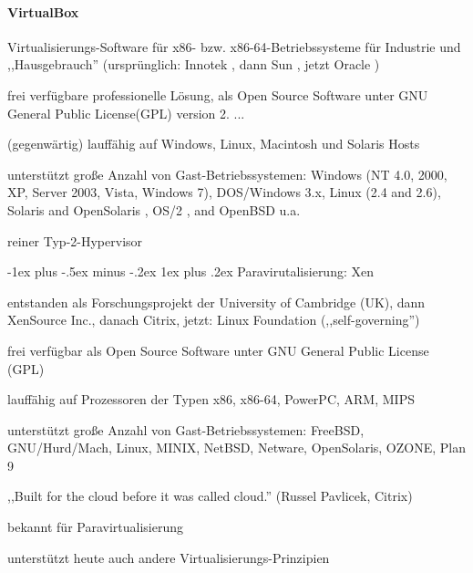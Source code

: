 \documentclass[a4paper]{article}
\makeatletter
\renewcommand{\subsubsection}{\@startsection{subsubsection}{3}{0mm}%
 {-1ex plus -.5ex minus -.2ex}%
 {1ex plus .2ex}%
 {\normalfont\small\bfseries}}
\makeatother
\begin{document}
\begin{multicols}{3}
    \paragraph{VirtualBox}

    \begin{itemize*}
        \item
        Virtualisierungs-Software für x86- bzw. x86-64-Betriebssysteme für
        Industrie und ,,Hausgebrauch'' (ursprünglich: Innotek , dann Sun ,
        jetzt Oracle )
        \item
        frei verfügbare professionelle Lösung, als Open Source Software unter
        GNU General Public License(GPL) version 2. ...
        \item
        (gegenwärtig) lauffähig auf Windows, Linux, Macintosh und Solaris
        Hosts
        \item
        unterstützt große Anzahl von Gast-Betriebssystemen: Windows (NT 4.0,
        2000, XP, Server 2003, Vista, Windows 7), DOS/Windows 3.x, Linux (2.4
        and 2.6), Solaris and OpenSolaris , OS/2 , and OpenBSD u.a.
        \item
        reiner Typ-2-Hypervisor
    \end{itemize*}


    \subsubsection{Paravirutalisierung: Xen}

    \begin{itemize*}
        \item
        entstanden als Forschungsprojekt der University of Cambridge (UK),
        dann XenSource Inc., danach Citrix, jetzt: Linux Foundation
        (,,self-governing'')
        \item
        frei verfügbar als Open Source Software unter GNU General Public
        License (GPL)
        \item
        lauffähig auf Prozessoren der Typen x86, x86-64, PowerPC, ARM, MIPS
        \item
        unterstützt große Anzahl von Gast-Betriebssystemen: FreeBSD,
        GNU/Hurd/Mach, Linux, MINIX, NetBSD, Netware, OpenSolaris, OZONE, Plan
        9
        \item
        ,,Built for the cloud before it was called cloud.'' (Russel Pavlicek,
        Citrix)
        \item
        bekannt für Paravirtualisierung
        \item
        unterstützt heute auch andere Virtualisierungs-Prinzipien
    \end{itemize*}


\end{multicols}
\end{document}
